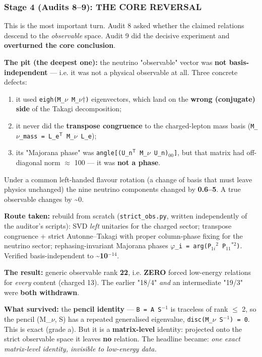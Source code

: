 \documentclass[11pt]{article}
\begin{document}
\subsubsection*{Stage 4 (Audits 8--9): THE CORE REVERSAL}

This is the most important turn. Audit 8 asked whether the claimed relations
descend to the \emph{observable} space. Audit 9 did the decisive experiment and
\textbf{overturned the core conclusion}.

\textbf{The pit (the deepest one):} the neutrino "observable" vector was \textbf{not
basis-independent} --- i.e. it was not a physical observable at all. Three concrete
defects:
\begin{enumerate}
\item it used \texttt{eigh(M\_$\nu$ M\_$\nu$$\dagger$)} eigenvectors, which land on the \textbf{wrong (conjugate)
   side} of the Takagi decomposition;
\item it never did the \textbf{transpose congruence} to the charged-lepton mass basis
   (\texttt{M\_$\nu$\_mass = L\_e$^{\mathsf T}$ M\_$\nu$ L\_e});
\item its "Majorana phase" was \texttt{angle[(U\_n$^{\mathsf T}$ M\_$\nu$ U\_n)$_{00}$]}, but that matrix had
   off-diagonal norm $\approx$ 100 --- it was \textbf{not a phase}.
\end{enumerate}

Under a common left-handed flavour rotation (a change of basis that must leave
physics unchanged) the nine neutrino components changed by \textbf{0.6--5}. A true
observable changes by \textasciitilde{}0.

\textbf{Route taken:} rebuild from scratch (\texttt{strict\_obs.py}, written independently of the
auditor's scripts): SVD \emph{left} unitaries for the charged sector; transpose
congruence + strict Autonne--Takagi with proper column-phase fixing for the neutrino
sector; rephasing-invariant Majorana phases \texttt{$\varphi$\_i = arg(P$_{1i}$$^2$ P$_{11}$$^{*2}$)}. Verified
basis-independent to \textbf{\textasciitilde{}10$^{-14}$}.

\textbf{The result:} generic observable rank \textbf{22}, i.e. \textbf{ZERO} forced low-energy
relations for \emph{every} content (charged 13). The earlier "18/4" \emph{and} an intermediate
"19/3" were \textbf{both withdrawn}.

\textbf{What survived:} the \textbf{pencil identity} --- \texttt{B = A S$^{-1}$} is traceless of rank $\leq$ 2,
so the pencil (M\_$\nu$, S) has a repeated generalised eigenvalue, \texttt{disc(M\_$\nu$ S$^{-1}$) = 0}.
This is exact (grade a). But it is a \textbf{matrix-level} identity: projected onto the
strict observable space it leaves \textbf{no} relation. The headline became: \emph{one exact
matrix-level identity, invisible to low-energy data.}
\end{document}
